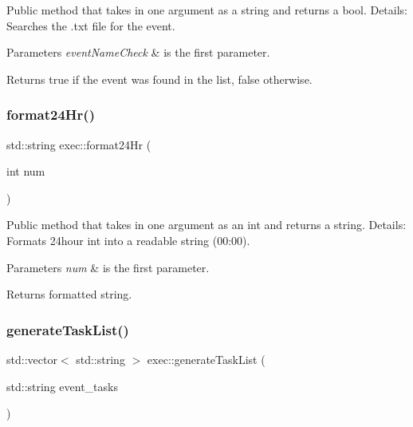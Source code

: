 Public method that takes in one argument as a string and returns a bool. Details\+: Searches the .txt file for the event. 
\begin{DoxyParams}{Parameters}
{\em event\+Name\+Check} & is the first parameter. \\
\hline
\end{DoxyParams}
\begin{DoxyReturn}{Returns}
true if the event was found in the list, false otherwise. 
\end{DoxyReturn}
\mbox{\label{classexec_a24a4ca6c8f63a73ed38ddc8e9d015c46}} 
\subsubsection{\texorpdfstring{format24\+Hr()}{format24Hr()}}
{\footnotesize\ttfamily std\+::string exec\+::format24\+Hr (\begin{DoxyParamCaption}\item[{int}]{num }\end{DoxyParamCaption})}

Public method that takes in one argument as an int and returns a string. Details\+: Formats 24hour int into a readable string (00\+:00). 
\begin{DoxyParams}{Parameters}
{\em num} & is the first parameter. \\
\hline
\end{DoxyParams}
\begin{DoxyReturn}{Returns}
formatted string. 
\end{DoxyReturn}
\mbox{\label{classexec_a056e0f55ae4c4661f7485fe8fc221210}} 
\subsubsection{\texorpdfstring{generate\+Task\+List()}{generateTaskList()}}
{\footnotesize\ttfamily std\+::vector$<$ std\+::string $>$ exec\+::generate\+Task\+List (\begin{DoxyParamCaption}\item[{std\+::string}]{event\+\_\+tasks }\end{DoxyParamCaption})}

